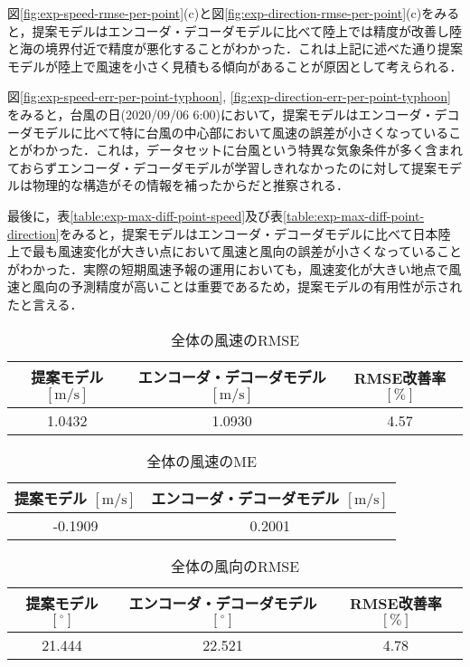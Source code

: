 図\ref{fig:exp-speed-rmse-per-point}(c)と図\ref{fig:exp-direction-rmse-per-point}(c)をみると，提案モデルはエンコーダ・デコーダモデルに比べて陸上では精度が改善し陸と海の境界付近で精度が悪化することがわかった．これは上記に述べた通り提案モデルが陸上で風速を小さく見積もる傾向があることが原因として考えられる．

図\ref{fig:exp-speed-err-per-point-typhoon}, \ref{fig:exp-direction-err-per-point-typhoon}をみると，台風の日(2020/09/06 6:00)において，提案モデルはエンコーダ・デコーダモデルに比べて特に台風の中心部において風速の誤差が小さくなっていることがわかった．これは，データセットに台風という特異な気象条件が多く含まれておらずエンコーダ・デコーダモデルが学習しきれなかったのに対して提案モデルは物理的な構造がその情報を補ったからだと推察される．

最後に，表\ref{table:exp-max-diff-point-speed}及び表\ref{table:exp-max-diff-point-direction}をみると，提案モデルはエンコーダ・デコーダモデルに比べて日本陸上で最も風速変化が大きい点において風速と風向の誤差が小さくなっていることがわかった．実際の短期風速予報の運用においても，風速変化が大きい地点で風速と風向の予測精度が高いことは重要であるため，提案モデルの有用性が示されたと言える．


\begin{table}[bp]
  \caption{全体の風速のRMSE}
  \label{table:exp-total-rmse}
  \centering
  \begin{tabular}{ccc}
    \hline
    提案モデル $\mathrm{[m/s]}$ & エンコーダ・デコーダモデル $\mathrm{[m/s]}$ & RMSE改善率 $\mathrm{[\%]}$ \\
    \hline
    1.0432 & 1.0930 & 4.57 \\
    \hline
  \end{tabular}
\end{table}

\begin{table}[bp]
  \caption{全体の風速のME}
  \label{table:exp-total-me}
  \centering
  \begin{tabular}{cc}
    \hline
    提案モデル $\mathrm{[m/s]}$ & エンコーダ・デコーダモデル $\mathrm{[m/s]}$ \\
    \hline
    -0.1909 & 0.2001 \\
    \hline
  \end{tabular}
\end{table}

\begin{table}[bp]
  \caption{全体の風向のRMSE}
  \label{table:exp-total-direction-rmse}
  \centering
  \begin{tabular}{ccc}
    \hline
    提案モデル $\mathrm{[^\circ]}$ & エンコーダ・デコーダモデル $\mathrm{[^\circ]}$ & RMSE改善率 $\mathrm{[\%]}$ \\
    \hline
    21.444 & 22.521 & 4.78 \\
    \hline
  \end{tabular}
\end{table}

